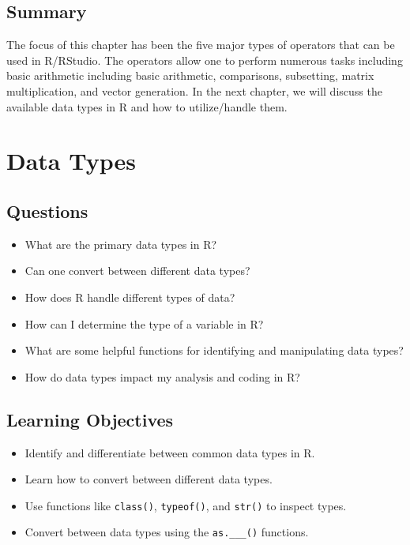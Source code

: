 \documentclass[
  letterpaper,
  DIV=11,
  numbers=noendperiod]{scrreprt}
\begin{document}
\section{Summary}\label{summary-6}

The focus of this chapter has been the five major types of operators
that can be used in R/RStudio. The operators allow one to perform
numerous tasks including basic arithmetic including basic arithmetic,
comparisons, subsetting, matrix multiplication, and vector generation.
In the next chapter, we will discuss the available data types in R and
how to utilize/handle them.


\chapter{Data Types}\label{sec-data-types}

\section{Questions}\label{questions-7}

\begin{itemize}
\item
  What are the primary data types in R?
\item
  Can one convert between different data types?
\item
  How does R handle different types of data?
\item
  How can I determine the type of a variable in R?
\item
  What are some helpful functions for identifying and manipulating data
  types?
\item
  How do data types impact my analysis and coding in R?
\end{itemize}

\section{Learning Objectives}\label{learning-objectives-7}

\begin{itemize}
\item
  Identify and differentiate between common data types in R.
\item
  Learn how to convert between different data types.
\item
  Use functions like \texttt{class()}, \texttt{typeof()}, and
  \texttt{str()} to inspect types.
\item
  Convert between data types using the \texttt{as.\_\_\_()} functions.
\end{itemize}
\end{document}
